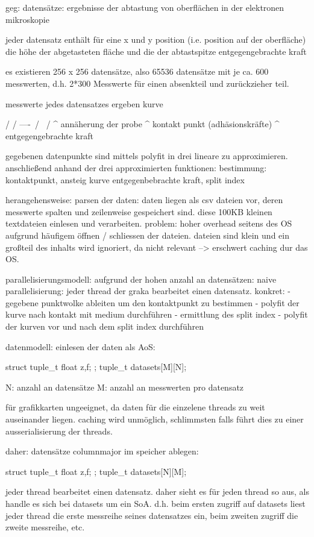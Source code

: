  
geg: datensätze: ergebnisse der abtastung von oberflächen in der elektronen mikroskopie


jeder datensatz enthält für eine x und y position (i.e. position auf der oberfläche) die höhe der abgetasteten fläche und die der abtastspitze entgegengebrachte kraft

es existieren 256 x 256 datensätze, also 65536 datensätze mit je ca. 600 messwerten, d.h. 2*300 Messwerte für einen absenkteil und zurückzieher teil.

messwerte jedes datensatzes ergeben kurve

           /
          /
----\    /
     \  /
      \/
 ^
 annäherung der probe
       ^
       kontakt punkt (adhäsionskräfte)
         ^ entgegengebrachte kraft
         
gegebenen datenpunkte sind mittels polyfit  in drei lineare zu approximieren. anschließend anhand der drei approximierten funktionen: bestimmung: kontaktpunkt, ansteig kurve entgegenbebrachte kraft, split index

herangehensweise: 
parsen der daten:
daten liegen als csv dateien vor, deren messwerte spalten und zeilenweise gespeichert sind. diese 100KB kleinen textdateien einlesen und verarbeiten.
problem: hoher overhead seitens des OS aufgrund häufigem öffnen / schliessen der dateien. dateien sind klein und ein großteil des inhalts wird ignoriert, da nicht relevant --> erschwert caching dur das OS.

parallelisierungsmodell:
aufgrund der hohen anzahl an datensätzen: naive parallelisierung: jeder thread der graka bearbeitet einen datensatz. konkret:
- gegebene punktwolke ableiten um den kontaktpunkt zu bestimmen
- polyfit der kurve nach kontakt mit medium durchführen
- ermittlung des split index
- polyfit der kurven vor und nach dem split index durchführen

datenmodell:
einlesen der daten als AoS:

struct tuple_t { float z,f; };
tuple_t datasets[M][N];

N: anzahl an datensätze
M: anzahl an messwerten pro datensatz

für grafikkarten ungeeignet, da daten für die einzelene threads zu weit auseinander liegen. caching wird unmöglich, schlimmsten falls führt dies zu einer ausserialisierung der threads.

daher: datensätze columnmajor im speicher ablegen:

struct tuple_t { float z,f; };
tuple_t datasets[N][M];

jeder thread bearbeitet einen datensatz. daher sieht es für jeden thread so aus, als handle es sich bei datasets um ein SoA. d.h. beim ersten zugriff auf datasets liest jeder thread die erste messreihe seines datensatzes ein, beim zweiten zugriff die zweite messreihe, etc.

